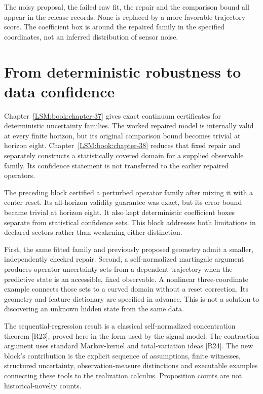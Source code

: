 The noisy proposal, the failed raw fit, the repair and the comparison
bound all appear in the release records. None is replaced by a more
favorable trajectory score. The coefficient box is around the repaired
family in the specified coordinates, not an inferred distribution of
sensor noise.

\section{From deterministic robustness to data confidence}\label{LSM:from-deterministic-robustness-to-data-confidence}

Chapter~\ref{LSM:book:chapter-37} gives exact continuum certificates for deterministic
uncertainty families. The worked repaired model is internally valid at
every finite horizon, but its original comparison bound becomes trivial
at horizon eight. Chapter~\ref{LSM:book:chapter-38} reduces that fixed repair and separately
constructs a statistically covered domain for a supplied observable
family. Its confidence statement is not transferred to the earlier
repaired operators.


\label{LSM:part-viii.-data-supported-domains-and-smaller-repairs}

The preceding block certified a perturbed operator family after mixing
it with a center reset. Its all-horizon validity guarantee was exact,
but its error bound became trivial at horizon eight. It also kept
deterministic coefficient boxes separate from statistical confidence
sets. This block addresses both limitations in declared sectors rather
than weakening either distinction.

First, the same fitted family and previously proposed geometry admit a
smaller, independently checked repair. Second, a self-normalized
martingale argument produces operator uncertainty sets from a dependent
trajectory when the predictive state is an accessible, fixed observable.
A nonlinear three-coordinate example connects those sets to a curved
domain without a reset correction. Its geometry and feature dictionary
are specified in advance. This is not a solution to discovering an
unknown hidden state from the same data.

The sequential-regression result is a classical self-normalized
concentration theorem {[}R23{]}, proved here in the form used by the
signal model. The contraction argument uses standard Markov-kernel and
total-variation ideas {[}R24{]}. The new block's contribution is the
explicit sequence of assumptions, finite witnesses, structured
uncertainty, observation-measure distinctions and executable examples
connecting these tools to the realization calculus. Proposition counts
are not historical-novelty counts.


